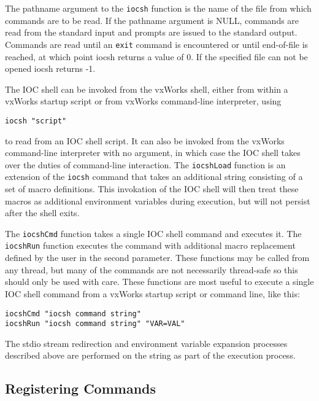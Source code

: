 
The pathname argument to the \verb|iocsh| function is the name of the file from which commands are to be read.
If the pathname argument is NULL, commands are read from the standard input and prompts are issued to the standard output.
Commands are read until an \verb|exit| command is encountered or until end-of-file is reached, at which point iocsh returns a value of 0.
If the specified file can not be opened iocsh returns -1.

The IOC shell can be invoked from the vxWorks shell, either from within a vxWorks startup script or from vxWorks command-line interpreter, using

\begin{verbatim}
iocsh "script"
\end{verbatim}

to read from an IOC shell script.
It can also be invoked from the vxWorks command-line interpreter with no argument, in which case the IOC shell takes over the duties of command-line interaction.
The \verb|iocshLoad| function is an extension of the \verb|iocsh| command that takes an additional string consisting of a set of macro definitions.
This invokation of the IOC shell will then treat these macros as additional environment variables during execution, but will not persist after the shell exits.

The \verb|iocshCmd| function takes a single IOC shell command and executes it.
The \verb|iocshRun| function executes the command with additional macro replacement defined by the user in the second parameter.
These functions may be called from any thread, but many of the commands are not necessarily thread-safe so this should only be used with care.
These functions are most useful to execute a single IOC shell command from a vxWorks startup script or command line, like this:

\begin{verbatim}
iocshCmd "iocsh command string"
iocshRun "iocsh command string" "VAR=VAL"
\end{verbatim}

The stdio stream redirection and environment variable expansion processes described above are performed on the string as part of the execution process.

\subsection{Registering Commands}

